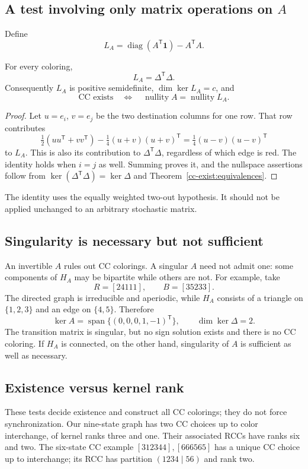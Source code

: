 \subsection{A test involving only matrix operations on $A$}
Define
\[
 L_A=\operatorname{diag}(A^{\mathsf T}\mathbf1)-A^{\mathsf T}A.
\]
\begin{proposition}\label{cc-exist:matrix-test}
For every coloring,
\[
 L_A=\Delta^{\mathsf T}\Delta.
\]
Consequently $L_A$ is positive semidefinite, $\dim\ker L_A=c$, and
\[
 \text{CC exists}\quad\Longleftrightarrow\quad
 \operatorname{nullity}A=\operatorname{nullity}L_A.
\]
\end{proposition}
\begin{proof}
Let $u=e_i$, $v=e_j$ be the two destination columns for one row.
That row contributes
\[
 \tfrac12(uu^{\mathsf T}+vv^{\mathsf T})
 -\tfrac14(u+v)(u+v)^{\mathsf T}
 =\tfrac14(u-v)(u-v)^{\mathsf T}
\]
to $L_A$. This is also its contribution to $\Delta^{\mathsf T}\Delta$,
regardless of which edge is red. The identity holds when $i=j$ as well.
Summing proves it, and the nullspace assertions follow from
$\ker(\Delta^{\mathsf T}\Delta)=\ker\Delta$ and
Theorem~\ref{cc-exist:equivalences}.
\end{proof}
The identity uses the equally weighted two-out hypothesis. It should not
be applied unchanged to an arbitrary stochastic matrix.

\subsection{Singularity is necessary but not sufficient}
An invertible $A$ rules out CC colorings. A singular $A$ need not admit one:
some components of $H_A$ may be bipartite while others are not.
For example, take
\[
 R=[24111],\qquad B=[35233].
\]
The directed graph is irreducible and aperiodic, while $H_A$ consists of
a triangle on $\{1,2,3\}$ and an edge on $\{4,5\}$. Therefore
\[
 \ker A=\operatorname{span}\{(0,0,0,1,-1)^{\mathsf T}\},
 \qquad \dim\ker\Delta=2.
\]
The transition matrix is singular, but no sign solution exists and there
is no CC coloring. If $H_A$ is connected, on the other hand, singularity
of $A$ is sufficient as well as necessary.

\subsection{Existence versus kernel rank}
These tests decide existence and construct all CC colorings; they do not
force synchronization. Our nine-state graph has two CC choices up to
color interchange, of kernel ranks three and one. Their associated RCCs
have ranks six and two. The six-state CC example $[312344],[666565]$
has a unique CC choice up to interchange; its RCC has partition
$(1234\mid56)$ and rank two.

